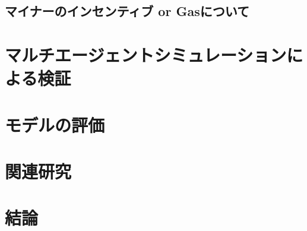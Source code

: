 \documentclass[a4paper,10.5pt]{bxjsarticle}
\begin{document}
\subsection{マイナーのインセンティブ or Gasについて}

\section{マルチエージェントシミュレーションによる検証}
\section{モデルの評価}
\section{関連研究}
\section{結論}

\begin{thebibliography}


\end{thebibliography}
\end{document}
